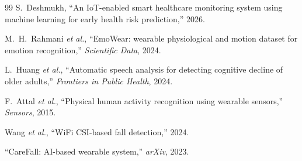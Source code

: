 \documentclass[conference]{IEEEtran}
\begin{document}
\begin{thebibliography}{99}
S.~Deshmukh, ``An IoT-enabled smart healthcare monitoring system using machine learning for early health risk prediction,'' 2026.

M.~H.~Rahmani \textit{et al.}, ``EmoWear: wearable physiological and motion dataset for emotion recognition,'' \textit{Scientific Data}, 2024.

L.~Huang \textit{et al.}, ``Automatic speech analysis for detecting cognitive decline of older adults,'' \textit{Frontiers in Public Health}, 2024.

F.~Attal \textit{et al.}, ``Physical human activity recognition using wearable sensors,'' \textit{Sensors}, 2015.

Wang \textit{et al.}, ``WiFi CSI-based fall detection,'' 2024.

``CareFall: AI-based wearable system,'' \textit{arXiv}, 2023.

\end{thebibliography}
\end{document}
